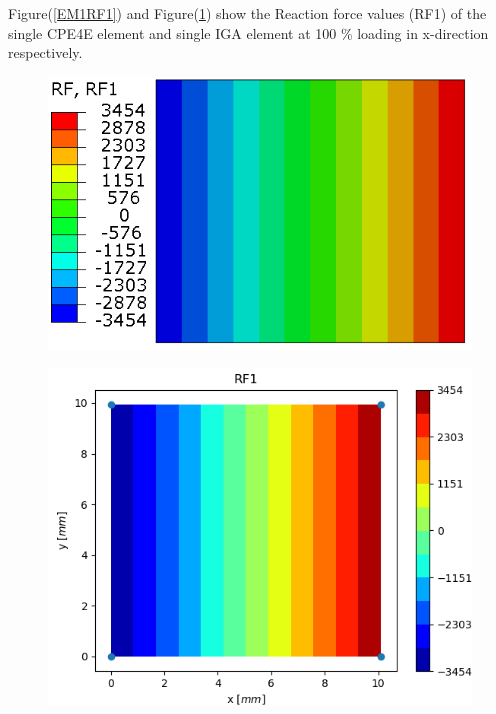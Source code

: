 \documentclass[11pt]{article}
\begin{document}
Figure(\ref{EM1RF1}) and Figure(\ref{EM1RF1_IGA}) show the Reaction force values (RF1) of the single CPE4E element and single IGA element at 100 \% loading in x-direction respectively. \\
\begin{figure}[H]
	\centering
	\begin{minipage}{.5\textwidth}
		\centering
		\includegraphics[width=1\linewidth]{EM1RF1.png}
		\label{EM1RF1}
	\end{minipage}%
	\begin{minipage}{.5\textwidth}
		\centering
		\includegraphics[width=1\linewidth]{EM1RF1_IGA.png}
		\label{EM1RF1_IGA}
	\end{minipage}
\end{figure}
\end{document}
